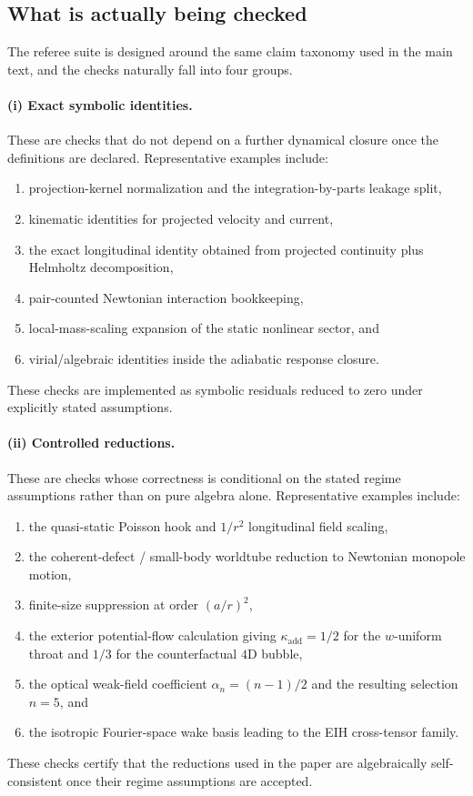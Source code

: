 \documentclass[11pt]{article}
\newcommand{\kadd}{\kappa_{\mathrm{add}}}
\begin{document}
\subsection{What is actually being checked}
\label{sec:verification-checked}

The referee suite is designed around the same claim taxonomy used in the main text, and
the checks naturally fall into four groups.

\paragraph{(i) Exact symbolic identities.}
These are checks that do not depend on a further dynamical closure once the definitions are
declared. Representative examples include:
\begin{enumerate}[leftmargin=1.5em]
  \item projection-kernel normalization and the integration-by-parts leakage split,
  \item kinematic identities for projected velocity and current,
  \item the exact longitudinal identity obtained from projected continuity plus Helmholtz
  decomposition,
  \item pair-counted Newtonian interaction bookkeeping,
  \item local-mass-scaling expansion of the static nonlinear sector, and
  \item virial/algebraic identities inside the adiabatic response closure.
\end{enumerate}
These checks are implemented as symbolic residuals reduced to zero under explicitly stated
assumptions.

\paragraph{(ii) Controlled reductions.}
These are checks whose correctness is conditional on the stated regime assumptions rather
than on pure algebra alone. Representative examples include:
\begin{enumerate}[leftmargin=1.5em]
  \item the quasi-static Poisson hook and \(1/r^2\) longitudinal field scaling,
  \item the coherent-defect / small-body worldtube reduction to Newtonian monopole motion,
  \item finite-size suppression at order \((a/r)^2\),
  \item the exterior potential-flow calculation giving \(\kadd=1/2\) for the
  \(w\)-uniform throat and \(1/3\) for the counterfactual \(4\)D bubble,
  \item the optical weak-field coefficient \(\alpha_n=(n-1)/2\) and the resulting
  selection \(n=5\), and
  \item the isotropic Fourier-space wake basis leading to the EIH cross-tensor family.
\end{enumerate}
These checks certify that the reductions used in the paper are algebraically self-consistent
once their regime assumptions are accepted.
\end{document}
